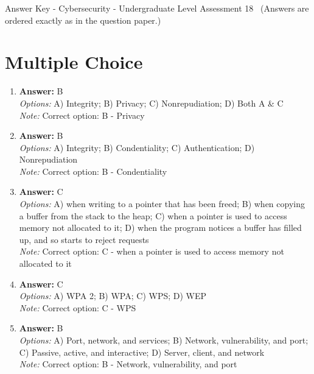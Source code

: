 \documentclass[12pt]{article}
\begin{document}
\begin{center}
Answer Key - Cybersecurity - Undergraduate Level Assessment 18 \
\small (Answers are ordered exactly as in the question paper.)
\end{center}

\section*{Multiple Choice}
\begin{enumerate}[label=\arabic*.]
\item \textbf{Answer:} B
\\ \textit{Options:} A) Integrity; B) Privacy; C) Nonrepudiation; D) Both A \& C
\\ \textit{Note:} Correct option: B - Privacy
\item \textbf{Answer:} B
\\ \textit{Options:} A) Integrity; B) Condentiality; C) Authentication; D) Nonrepudiation
\\ \textit{Note:} Correct option: B - Condentiality
\item \textbf{Answer:} C
\\ \textit{Options:} A) when writing to a pointer that has been freed; B) when copying a buffer from the stack to the heap; C) when a pointer is used to access memory not allocated to it; D) when the program notices a buffer has filled up, and so starts to reject requests
\\ \textit{Note:} Correct option: C - when a pointer is used to access memory not allocated to it
\item \textbf{Answer:} C
\\ \textit{Options:} A) WPA 2; B) WPA; C) WPS; D) WEP
\\ \textit{Note:} Correct option: C - WPS
\item \textbf{Answer:} B
\\ \textit{Options:} A) Port, network, and services; B) Network, vulnerability, and port; C) Passive, active, and interactive; D) Server, client, and network
\\ \textit{Note:} Correct option: B - Network, vulnerability, and port
\end{enumerate}
\end{document}
